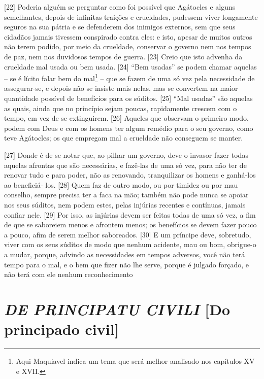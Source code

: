 {[}22{]} Poderia alguém se perguntar como foi possível que Agátocles e
alguns semelhantes, depois de infinitas traições e crueldades, pudessem
viver longamente seguros na sua pátria e se defenderem dos inimigos
externos, sem que seus cidadãos jamais tivessem conspirado contra eles:
e isto, apesar de muitos outros não terem podido, por meio da crueldade,
conservar o governo nem nos tempos de paz, nem nos duvidosos tempos de
guerra. {[}23{]} Creio que isto advenha da crueldade mal usada ou bem
usada. {[}24{]} ``Bem usadas'' se podem chamar aquelas -- se é lícito
falar bem do mal\footnote{Aqui Maquiavel indica um tema que será melhor
  analisado nos capítulos XV e XVII.} -- que se fazem de uma só vez pela
necessidade de assegurar-se, e depois não se insiste mais nelas, mas se
convertem na maior quantidade possível de benefícios para os súditos.
{[}25{]} ``Mal usadas'' são aquelas as quais, ainda que no princípio
sejam poucas, rapidamente crescem com o tempo, em vez de se extinguirem.
{[}26{]} Aqueles que observam o primeiro modo, podem com Deus e com os
homens ter algum remédio para o seu governo, como teve Agátocles; os que
empregam mal a crueldade não conseguem se manter.

{[}27{]} Donde é de se notar que, ao pilhar um governo, deve o invasor
fazer todas aquelas afrontas que são necessárias, e fazê-las de uma só
vez, para não ter de renovar tudo e para poder, não as renovando,
tranquilizar os homens e ganhá-los ao beneficiá- los. {[}28{]} Quem faz
de outro modo, ou por timidez ou por mau conselho, sempre precisa ter a
faca na mão; também não pode nunca se apoiar nos seus súditos, nem podem
estes, pelas injúrias recentes e contínuas, jamais confiar nele.
{[}29{]} Por isso, as injúrias devem ser feitas todas de uma só vez, a
fim de que se saboreiem menos e afrontem menos; os benefícios se devem
fazer pouco a pouco, afim de serem melhor saboreados. {[}30{]} E um
príncipe deve, sobretudo, viver com os seus súditos de modo que nenhum
acidente, mau ou bom, obrigue-o a mudar, porque, advindo as necessidades
em tempos adversos, você não terá tempo para o mal, e o bem que fizer
não lhe serve, porque é julgado forçado, e não terá com ele nenhum
reconhecimento

\quebra\section{\emph{DE PRINCIPATU CIVILI}\break
{[}Do principado civil{]}}

